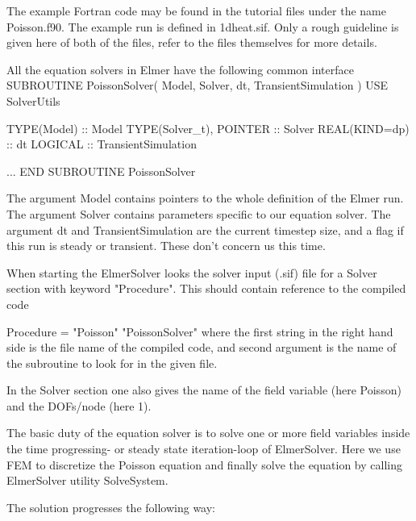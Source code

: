 The example Fortran code may be found in the tutorial files under the
name Poisson.f90.  The example run is defined in 1dheat.sif.
Only a rough guideline is given here of both of the files, refer to the
files themselves for more details.

All the  equation solvers in Elmer have the following common interface
\ttbegin
SUBROUTINE PoissonSolver( Model, Solver, dt, TransientSimulation )
  USE SolverUtils

  TYPE(Model) :: Model
  TYPE(Solver_t), POINTER :: Solver
  REAL(KIND=dp) :: dt
  LOGICAL :: TransientSimulation

    ...
END SUBROUTINE PoissonSolver
\ttend

The argument Model contains pointers to the whole definition of the Elmer run.
The argument Solver contains parameters specific to our equation solver.
The argument dt and TransientSimulation are the current timestep size, and a
flag if this run is steady or transient. These don't concern us this time.

When starting the ElmerSolver looks the solver input (.sif) file for a
Solver section with keyword "Procedure". This should contain reference to
the compiled code

\ttbegin
   Procedure = "Poisson" "PoissonSolver"
\ttend
where the first string in the right hand side is the file name of the compiled
code, and second argument is the name of the subroutine to look for in the given file.

In the Solver section one also gives the name of the field variable
(here Poisson) and the DOFs/node (here 1).

The basic duty of the equation solver is to solve one or more field variables inside
the time progressing- or steady state iteration-loop of ElmerSolver.  Here we use
FEM to discretize the Poisson equation and finally solve the equation by calling
ElmerSolver utility SolveSystem.

The solution progresses the following way:

